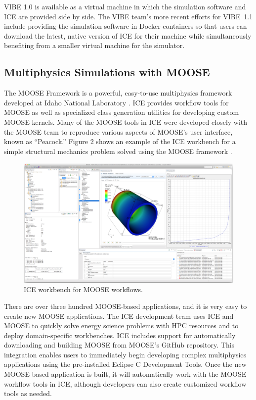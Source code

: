 VIBE 1.0 is available as a virtual machine in which the simulation
software and ICE are provided side by side. The VIBE team's more recent 
efforts for VIBE~1.1 include providing the simulation
software in Docker containers so that users can download the latest,
native version of ICE for their machine while simultaneously benefiting
from a smaller virtual machine for the simulator.

\subsection{Multiphysics Simulations with
MOOSE}\label{multiphysics-simulations-with-moose}

The MOOSE Framework is a powerful, easy-to-use multiphysics framework
developed at Idaho National Laboratory \cite{gaston_moose:_2009}. ICE
provides workflow tools for MOOSE as well as specialized class
generation utilities for developing custom MOOSE kernels. Many of the
MOOSE tools in ICE were developed closely with the MOOSE team to
reproduce various aspects of MOOSE's user interface, known as ``Peacock.'' 
Figure 2 shows an example of the ICE workbench for a simple structural mechanics
problem solved using the MOOSE framework \cite{mccaskey_scientific_2015}.

\begin{figure}[htbp]
\centering
\includegraphics[width=\textwidth]{images/ice-moose.png}
\caption{ICE workbench for MOOSE workflows.}
\end{figure}

There are over three hundred MOOSE-based applications, and it is very
easy to create new MOOSE applications. The ICE development team uses ICE
and MOOSE to quickly solve energy science problems with HPC resources 
and to deploy domain-specific workbenches. ICE includes
support for automatically downloading and building MOOSE from MOOSE's GitHub
repository. This integration enables users to immediately begin developing
complex multiphysics applications using the pre-installed Eclipse C Development 
Tools. Once the new MOOSE-based application is built, it will automatically work with
the MOOSE workflow tools in ICE, although developers can also create
customized workflow tools as needed.

